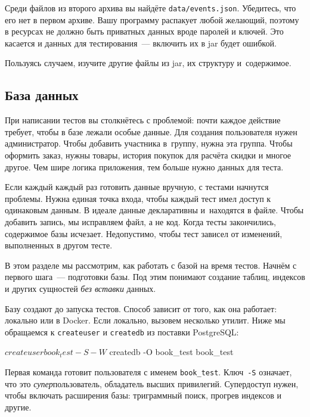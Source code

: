 Среди файлов из второго архива вы найдёте \verb|data/events.json|. Убедитесь,
что его нет в первом архиве. Вашу программу распакует любой желающий, поэтому в
ресурсах не должно быть приватных данных вроде паролей и ключей. Это касается и
данных для тестирования~--- включить их в jar будет ошибкой.

Пользуясь случаем, изучите другие файлы из jar, их структуру и~содержимое.

\subsection{База данных}


При написании тестов вы столкнётесь с проблемой: почти каждое действие требует,
чтобы в базе лежали особые данные. Для создания пользователя нужен
администратор. Чтобы добавить участника в~группу, нужна эта группа. Чтобы
оформить заказ, нужны товары, история покупок для расчёта скидки и многое
другое. Чем шире логика приложения, тем больше нужно данных для теста.

Если каждый каждый раз готовить данные вручную, с тестами начнутся
проблемы. Нужна единая точка входа, чтобы каждый тест имел доступ к одинаковым
данным. В идеале данные декларативны и~находятся в файле. Чтобы добавить запись,
мы исправляем файл, а не код. Когда тесты закончились, содержимое базы
исчезает. Недопустимо, чтобы тест зависел от изменений, выполненных в другом
тесте.

В этом разделе мы рассмотрим, как работать с базой на время тестов. Начнём с
первого шага~--- подготовки базы. Под этим понимают создание таблиц, индексов и
других сущностей \emph{без вставки} данных.


Базу создают до запуска тестов. Способ зависит от того, как она работает:
локально или в Docker. Если локально, вызовем несколько утилит. Ниже мы
обращаемся к \verb|createuser| и \verb|createdb| из поставки PostgreSQL:

\begin{english}
  \begin{bash}
$ createuser book_test -S -W
$ createdb -O book_test book_test
  \end{bash}
\end{english}

Первая команда готовит пользователя с именем \verb|book_test|. Ключ~\verb|-S|
означает, что это \emph{супер}пользователь, обладатель высших
привилегий. Супердоступ нужен, чтобы включать расширения базы: триграммный
поиск, прогрев индексов и другие.

